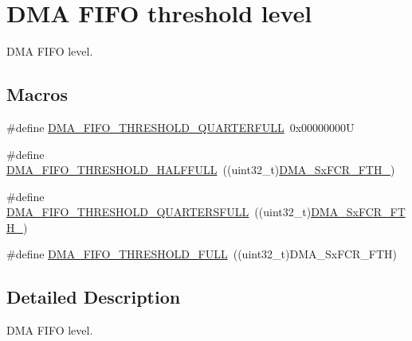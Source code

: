 \hypertarget{group___d_m_a___f_i_f_o__threshold__level}{}\section{D\+MA F\+I\+FO threshold level}
\label{group___d_m_a___f_i_f_o__threshold__level}


D\+MA F\+I\+FO level.  


\subsection*{Macros}
\begin{DoxyCompactItemize}
\item 
\#define \hyperlink{group___d_m_a___f_i_f_o__threshold__level_ga4debbd5733190b61b2115613d4b3658b}{D\+M\+A\+\_\+\+F\+I\+F\+O\+\_\+\+T\+H\+R\+E\+S\+H\+O\+L\+D\+\_\+Q\+U\+A\+R\+T\+E\+R\+F\+U\+LL}~0x00000000U
\item 
\#define \hyperlink{group___d_m_a___f_i_f_o__threshold__level_gad2b071aa3a3bfc936017f12fb956c56f}{D\+M\+A\+\_\+\+F\+I\+F\+O\+\_\+\+T\+H\+R\+E\+S\+H\+O\+L\+D\+\_\+\+H\+A\+L\+F\+F\+U\+LL}~((uint32\+\_\+t)\hyperlink{group___peripheral___registers___bits___definition_ga63716e11d34bca95927671055aa63fe8}{D\+M\+A\+\_\+\+Sx\+F\+C\+R\+\_\+\+F\+T\+H\+\_})
\item 
\#define \hyperlink{group___d_m_a___f_i_f_o__threshold__level_gae1e4ba12bae8440421e6672795d71223}{D\+M\+A\+\_\+\+F\+I\+F\+O\+\_\+\+T\+H\+R\+E\+S\+H\+O\+L\+D\+\_\+Q\+U\+A\+R\+T\+E\+R\+S\+F\+U\+LL}~((uint32\+\_\+t)\hyperlink{group___peripheral___registers___bits___definition_gae3d780fc1222a183071c73e62a0524a1}{D\+M\+A\+\_\+\+Sx\+F\+C\+R\+\_\+\+F\+T\+H\+\_})
\item 
\#define \hyperlink{group___d_m_a___f_i_f_o__threshold__level_ga5de463bb24dc12fe7bbb300e1e4493f7}{D\+M\+A\+\_\+\+F\+I\+F\+O\+\_\+\+T\+H\+R\+E\+S\+H\+O\+L\+D\+\_\+\+F\+U\+LL}~((uint32\+\_\+t)D\+M\+A\+\_\+\+Sx\+F\+C\+R\+\_\+\+F\+TH)
\end{DoxyCompactItemize}


\subsection{Detailed Description}
D\+MA F\+I\+FO level. 



